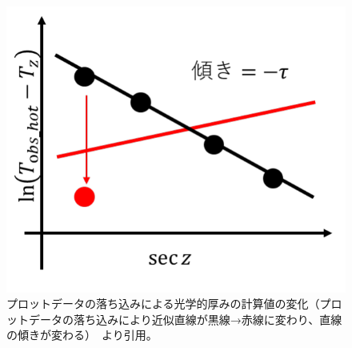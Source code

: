 \begin{figure}[htbp]
    \centering
    \includegraphics{master_thesis_contents/master_thesis_fig/optical_depth_slope_minus.pdf}
    \caption{プロットデータの落ち込みによる光学的厚みの計算値の変化（プロットデータの落ち込みにより近似直線が黒線→赤線に変わり、直線の傾きが変わる）~\cite{goto2021bachelor}より引用。}
    \label{fig:optical_depth_slope_minus}
\end{figure}
